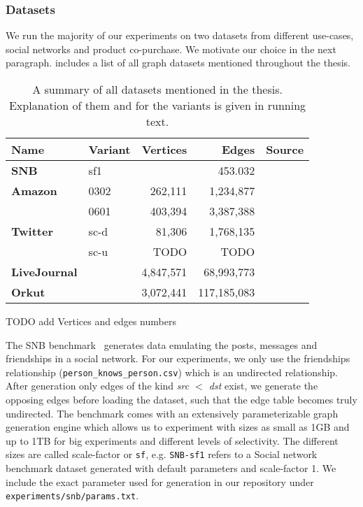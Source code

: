 \subsubsection{Datasets}
We run the majority of our experiments on two datasets from different use-cases, social networks and product co-purchase.
We motivate our choice in the next paragraph.
 includes a list of all graph datasets mentioned throughout the thesis.

\begin{table}[]
    \centering
    \begin{tabular}{llrrl} \toprule
        Name    & Variant         &  Vertices   & Edges          & Source          \\ \midrule
        \textbf{SNB}         & sf1     &             &  453.032       & \cite{snb}      \\
        \textbf{Amazon}      & 0302    & 262,111     &  1,234,877     & \cite{snapnets} \\
                             & 0601    & 403,394     &  3,387,388     & \cite{snapnets} \\
        \textbf{Twitter}     & sc-d    & 81,306      &  1,768,135     & \cite{snapnets} \\
                             & sc-u    &   TODO      &       TODO     & \cite{snapnets} \\
        \textbf{LiveJournal} &         & 4,847,571   & 68,993,773     & \cite{snapnets} \\
        \textbf{Orkut}       &         & 3,072,441   & 117,185,083    & \cite{snapnets} \\ \bottomrule
    \end{tabular}
    \caption{A summary of all datasets mentioned in the thesis.
    Explanation of them and for the variants is given in running text.
    }
    \label{table:datasets}
\end{table}

 TODO add Vertices and edges numbers

The SNB benchmark~\cite{snb} generates data emulating the posts, messages and friendships in a social network.
For our experiments, we only use the friendships relationship (\texttt{person\_knows\_person.csv}) which is an undirected relationship.
After generation only edges of the kind \textit{src $<$ dst} exist, we generate the opposing edges before loading the dataset, such
that the edge table becomes truly undirected.
The benchmark comes with an extensively parameterizable graph generation engine
which allows us to experiment with sizes as small as 1GB and up to 1TB for big experiments and different levels of selectivity.
The different sizes are called scale-factor or \texttt{sf}, e.g. \texttt{SNB-sf1} refers to a Social network benchmark dataset generated with
default parameters and scale-factor 1.
We include the exact parameter used for generation in our repository under \texttt{experiments/snb/params.txt}. %

